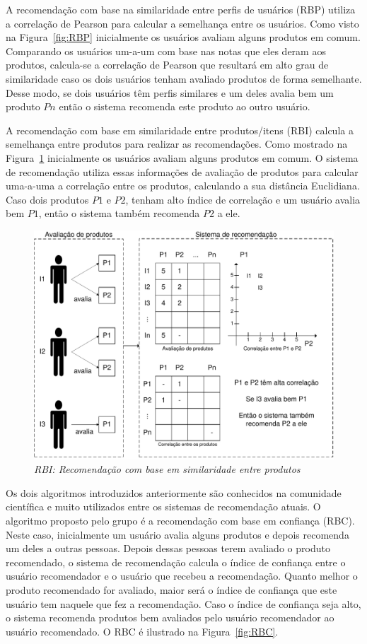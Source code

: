  A recomendação com base na similaridade entre perfis de usuários (RBP) utiliza a correlação de Pearson para calcular a semelhança entre os usuários. Como visto na Figura~\ref{fig:RBP} inicialmente os usuários avaliam alguns produtos em comum. Comparando os usuários um-a-um com base nas notas que eles deram aos produtos, calcula-se a correlação de Pearson que resultará em alto grau de similaridade caso os dois usuários tenham avaliado produtos de forma semelhante. Desse modo, se dois usuários têm perfis similares e um deles avalia bem um produto $P{n}$ então o sistema recomenda este produto ao outro usuário.

 A recomendação com base em similaridade entre produtos/itens (RBI) calcula a semelhança entre produtos para realizar as recomendações. Como mostrado na Figura~\ref{fig:RBI} inicialmente os usuários avaliam alguns produtos em comum. O sistema de recomendação utiliza essas informações de avaliação de produtos para calcular uma-a-uma a correlação entre os produtos, calculando a sua distância Euclidiana. Caso dois produtos $P{1}$ e $P{2}$, tenham alto índice de correlação e um usuário avalia bem $P{1}$, então o sistema também recomenda $P{2}$ a ele.

\begin{figure}
  \centering
  \includegraphics[width=\textwidth]{imagens/RBI}
  \caption{\it RBI: Recomendação com base em similaridade entre produtos}
  \label{fig:RBI}
\end{figure}

 Os dois algoritmos introduzidos anteriormente são conhecidos na comunidade científica e muito utilizados entre os sistemas de recomendação atuais. O algoritmo proposto pelo grupo é a recomendação com base em confiança (RBC). Neste caso, inicialmente um usuário avalia alguns produtos e depois recomenda um deles a outras pessoas. Depois dessas pessoas terem avaliado o produto recomendado, o sistema de recomendação calcula o índice de confiança entre o usuário recomendador e o usuário que recebeu a recomendação. Quanto melhor o produto recomendado for avaliado, maior será o índice de confiança que este usuário tem naquele que fez a recomendação. Caso o índice de confiança seja alto, o sistema recomenda produtos bem avaliados pelo usuário recomendador ao usuário recomendado. O RBC é ilustrado na Figura~\ref{fig:RBC}.

